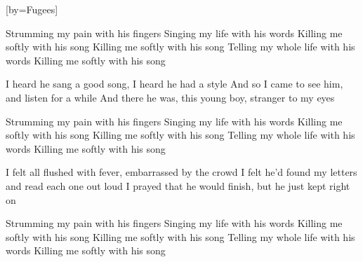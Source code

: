 [by={Fugees}]

  \chordsoff

  \beginchorus
  Strumming my pain with his fingers
  Singing my life with his words
  Killing me softly with his song
  Killing me softly with his song
  Telling my whole life with his words
  Killing me softly with his song  
  \endchorus

  
  \beginverse
  I heard he sang a good song,
  I heard he had a style
  And so I came to see him,
  and listen for a while
  And there he was, this young boy,
  stranger to my eyes
  \endverse

  \beginchorus
  Strumming my pain with his fingers
  Singing my life with his words
  Killing me softly with his song
  Killing me softly with his song
  Telling my whole life with his words
  Killing me softly with his song
  \endchorus

  \beginverse
  I felt all flushed with fever,
  embarrassed by the crowd
  I felt he'd found my letters
  and read each one out loud
  I prayed that he would finish,
  but he just kept right on
  \endverse

  \beginchorus
  Strumming my pain with his fingers
  Singing my life with his words
  Killing me softly with his song
  Killing me softly with his song
  Telling my whole life with his words
  Killing me softly with his song
  \endchorus
\endsong
